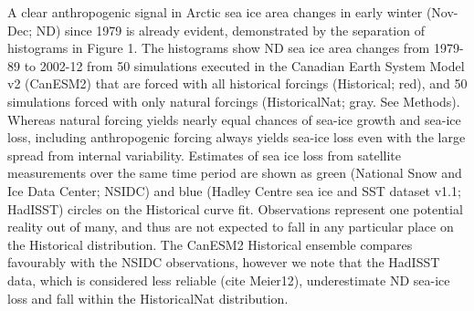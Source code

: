 \documentclass[grl]{AGUTeX}  %
\begin{document}
\begin{article}

A clear anthropogenic signal in Arctic sea ice area changes in early winter (Nov-Dec; ND) since 1979 is already evident, demonstrated by the separation of histograms in Figure 1. The histograms show ND sea ice area changes from 1979-89 to 2002-12 from 50 simulations executed in the Canadian Earth System Model v2 (CanESM2) that are forced with all historical forcings (Historical; red), and 50 simulations forced with only natural forcings (HistoricalNat; gray. See Methods). Whereas natural forcing yields nearly equal chances of sea-ice growth and sea-ice loss, including anthropogenic forcing always yields sea-ice loss even with the large spread from internal variability. Estimates of sea ice loss from satellite measurements over the same time period are shown as green (National Snow and Ice Data Center; NSIDC) and blue (Hadley Centre sea ice and SST dataset v1.1; HadISST) circles on the Historical curve fit. Observations represent one potential reality out of many, and thus are not expected to fall in any particular place on the Historical distribution. The CanESM2 Historical ensemble compares favourably with the NSIDC observations, however we note that the HadISST data, which is considered less reliable (cite Meier12), underestimate ND sea-ice loss and fall within the HistoricalNat distribution. %


\end{article}
\end{document}
